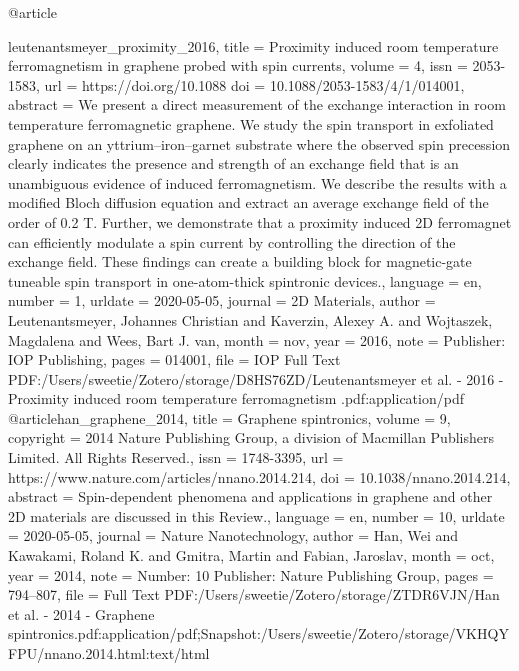 @article{leutenantsmeyer_proximity_2016,
	title = {Proximity induced room temperature ferromagnetism in graphene probed with spin currents},
	volume = {4},
	issn = {2053-1583},
	url = {https://doi.org/10.1088%
	doi = {10.1088/2053-1583/4/1/014001},
	abstract = {We present a direct measurement of the exchange interaction in room temperature ferromagnetic graphene. We study the spin transport in exfoliated graphene on an yttrium–iron–garnet substrate where the observed spin precession clearly indicates the presence and strength of an exchange field that is an unambiguous evidence of induced ferromagnetism. We describe the results with a modified Bloch diffusion equation and extract an average exchange field of the order of 0.2 T. Further, we demonstrate that a proximity induced 2D ferromagnet can efficiently modulate a spin current by controlling the direction of the exchange field. These findings can create a building block for magnetic-gate tuneable spin transport in one-atom-thick spintronic devices.},
	language = {en},
	number = {1},
	urldate = {2020-05-05},
	journal = {2D Materials},
	author = {Leutenantsmeyer, Johannes Christian and Kaverzin, Alexey A. and Wojtaszek, Magdalena and Wees, Bart J. van},
	month = nov,
	year = {2016},
	note = {Publisher: IOP Publishing},
	pages = {014001},
	file = {IOP Full Text PDF:/Users/sweetie/Zotero/storage/D8HS76ZD/Leutenantsmeyer et al. - 2016 - Proximity induced room temperature ferromagnetism .pdf:application/pdf}
}
@article{han_graphene_2014,
	title = {Graphene spintronics},
	volume = {9},
	copyright = {2014 Nature Publishing Group, a division of Macmillan Publishers Limited. All Rights Reserved.},
	issn = {1748-3395},
	url = {https://www.nature.com/articles/nnano.2014.214},
	doi = {10.1038/nnano.2014.214},
	abstract = {Spin-dependent phenomena and applications in graphene and other 2D materials are discussed in this Review.},
	language = {en},
	number = {10},
	urldate = {2020-05-05},
	journal = {Nature Nanotechnology},
	author = {Han, Wei and Kawakami, Roland K. and Gmitra, Martin and Fabian, Jaroslav},
	month = oct,
	year = {2014},
	note = {Number: 10
Publisher: Nature Publishing Group},
	pages = {794--807},
	file = {Full Text PDF:/Users/sweetie/Zotero/storage/ZTDR6VJN/Han et al. - 2014 - Graphene spintronics.pdf:application/pdf;Snapshot:/Users/sweetie/Zotero/storage/VKHQYFPU/nnano.2014.html:text/html}
}

}
